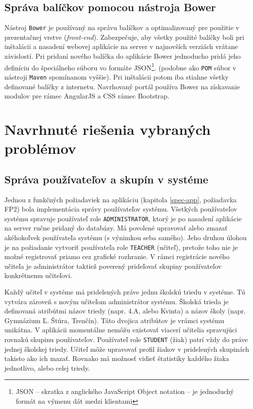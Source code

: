 \documentclass[12pt,oneside]{fithesis2}
\begin{document}
		\subsection{Správa balíčkov pomocou nástroja Bower}
		\par Nástroj \texttt{Bower} je používaný na správu balíčkov a optimalizovaný pre použitie v prezentačnej vrstve (\textit{front-end}). Zabezpečuje, aby všetky použité balíčky boli pri inštalácii a nasadení webovej aplikácie na server v najnovších verziách vrátane závislostí\cite{bower15}. Pri pridaní nového balíčka do aplikácie Bower jednoducho pridá jeho definíciu do špeciálneho súboru vo formáte JSON\footnote{JSON -- skratka z anglického JavaScript Object notation -- je jednoduchý formát na výmenu dát medzi klientami}. (podobne ako \texttt{POM} súbor v nástroji \texttt{Maven} spomínanom vyššie). Pri inštalácii potom iba stiahne všetky definované balíčky z internetu. Navrhovaný portál používa Bower na získavanie modulov pre rámec AngularJS a CSS rámec Bootstrap.
		
		\pagebreak	
	\section{Navrhnuté riešenia vybraných problémov} \label{solutions}

		\subsection{Správa používateľov a skupín v systéme} \label{pouzivatelia-sprava}
\par Jednou z funkčných požiadaviek na aplikáciu (kapitola \ref{spec-app}, požiadavka FP2) bola implementácia správy používateľov systému. Všetkých používateľov systému spravuje používateľ role \texttt{ADMINISTRATOR}, ktorý je po nasadení aplikácie na server ručne pridaný do databázy. Má povolené upravovať alebo zmazať akéhokoľvek používateľa systému (s výnimkou seba samého). Jeho druhou úlohou je na požiadanie vytvoriť používateľa role \texttt{TEACHER} (učiteľ), pretože toho nie je možné registrovať priamo cez grafické rozhranie. V rámci registrácie nového učiteľa je administrátor taktiež poverený prideľovať skupiny používateľov konkrétnemu učiteľovi.
\par Každý učiteľ v systéme má pridelených práve jednu školskú triedu v systéme. Tú vytvára zároveň s novým učiteľom administrátor systému. Školská trieda je definovaná atribútmi názov triedy (napr. 4.A, alebo Kvinta) a názov školy (napr. Gymnázium Ľ. Štúra, Trenčín). Táto dvojica atribútov je vrámci systému unikátna. V aplikácii momentálne nemôžu existovať viacerí učitelia spravujúci rovnakú skupinu používateľov. Používateľ role \texttt{STUDENT} (žiak) patrí vždy do práve jednej školskej triedy. Učiteľ môže upravovať profil žiakov v pridelených skupinách takisto ako ich mazať. Rovnako má možnosť vidieť štatistiky každého žiaka jednotlivo, alebo celej triedy.
     		
\end{document}
